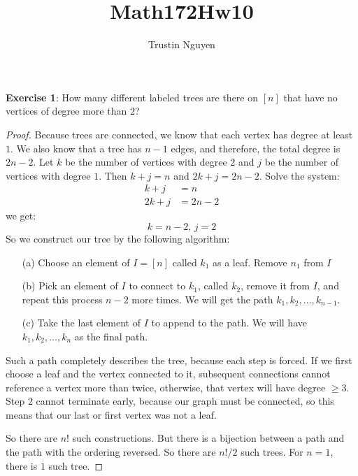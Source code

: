 \documentclass{article}
\title{Math172Hw10}
\author{Trustin Nguyen}
\begin{document}
    \maketitle

\reversemarginpar

\textbf{Exercise 1}: How many different labeled trees are there on $[n]$ that have no vertices of degree more than $2$?
    \begin{proof}
        Because trees are connected, we know that each vertex has degree at least $1$. We also know that a tree has $n - 1$ edges, and therefore, the total degree is $2n - 2$. Let $k$ be the number of vertices with degree $2$ and $j$ be the number of vertices with degree $1$. Then $k + j = n$ and $2k + j = 2n - 2$. Solve the system:
            \begin{align*}
                k + j  & = n      \\
                2k + j &=  2n - 2   
            \end{align*}
        we get:
            \begin{equation*}
                k = n - 2, \, j = 2
            \end{equation*}
        So we construct our tree by the following algorithm:
            \begin{itemize}
                \item [(a)] Choose an element of $I = [n]$ called $k_{1}$ as a leaf. Remove $n_{1}$ from $I$

                \item [(b)] Pick an element of $I$ to connect to $k_{1}$, called $k_{2}$, remove it from $I$, and repeat this process $n - 2$ more times. We will get the path $k_{1}, k_{2}, \ldots, k_{n - 1}$.

                \item [(c)] Take the last element of $I$ to append to the path. We will have $k_{1},  k_{2}, \ldots, k_{n}$ as the final path.
            \end{itemize}
        Such a path completely describes the tree, because each step is forced. If we first choose a leaf and the vertex connected to it, subsequent connections cannot reference a vertex more than twice, otherwise, that vertex will have degree $\geq 3$. Step $2$ cannot terminate early, because our graph must be connected, so this means that our last or first vertex was not a leaf.

        So there are $n!$ such constructions. But there is a bijection between a path and the path with the ordering reversed. So there are $n!/2$ such trees. For $n = 1$, there is $1$ such tree.
    \end{proof}
\end{document}
